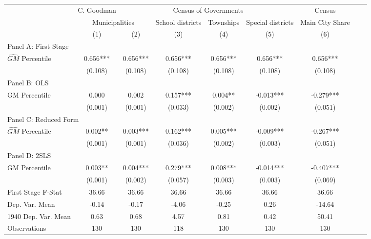  \begin{tabular}{l*{8}{c}} \toprule
&\multicolumn{1}{c}{C. Goodman}&\multicolumn{4}{c}{Census of Governments}&\multicolumn{1}{c}{Census}\\\cmidrule(lr){2-2}\cmidrule(lr){3-6}\cmidrule(lr){7-7}
&\multicolumn{2}{c}{Municipalities}&\multicolumn{1}{c}{School districts}&\multicolumn{1}{c}{Townships}&\multicolumn{1}{c}{Special districts}&\multicolumn{1}{c}{Main City Share}\\\cmidrule(lr){2-3}\cmidrule(lr){4-6}\cmidrule(lr){7-7}
&\multicolumn{1}{c}{(1)}&\multicolumn{1}{c}{(2)}&\multicolumn{1}{c}{(3)}&\multicolumn{1}{c}{(4)}&\multicolumn{1}{c}{(5)}&\multicolumn{1}{c}{(6)}\\
\cmidrule(lr){1-7}
\multicolumn{6}{l}{Panel A: First Stage}\\
\cmidrule(lr){1-7}
$\widehat{GM}$ Percentile&    0.656***&    0.656***&    0.656***&    0.656***&    0.656***&    0.656***\\
                &  (0.108)   &  (0.108)   &  (0.108)   &  (0.108)   &  (0.108)   &  (0.108)   \\
\cmidrule(lr){1-7}
\multicolumn{6}{l}{Panel B: OLS}\\
\cmidrule(lr){1-7}
GM Percentile   &    0.000   &    0.002   &    0.157***&    0.004** &   -0.013***&   -0.279***\\
                &  (0.001)   &  (0.001)   &  (0.033)   &  (0.002)   &  (0.002)   &  (0.051)   \\
\cmidrule(lr){1-7}
\multicolumn{6}{l}{Panel C: Reduced Form}\\
\cmidrule(lr){1-7}
$\widehat{GM}$ Percentile&    0.002** &    0.003***&    0.162***&    0.005***&   -0.009***&   -0.267***\\
                &  (0.001)   &  (0.001)   &  (0.036)   &  (0.002)   &  (0.003)   &  (0.051)   \\
\cmidrule(lr){1-7}
\multicolumn{6}{l}{Panel D: 2SLS}\\
\cmidrule(lr){1-7}
GM Percentile   &    0.003** &    0.004***&    0.279***&    0.008***&   -0.014***&   -0.407***\\
                &  (0.001)   &  (0.002)   &  (0.057)   &  (0.003)   &  (0.003)   &  (0.069)   \\
\midrule
First Stage F-Stat&    36.66   &    36.66   &    36.66   &    36.66   &    36.66   &    36.66   \\
Dep. Var. Mean  &    -0.14   &    -0.17   &    -4.06   &    -0.25   &     0.26   &   -14.64   \\
1940 Dep. Var. Mean&     0.63   &     0.68   &     4.57   &     0.81   &     0.42   &    50.41   \\
Observations    &      130   &      130   &      118   &      130   &      130   &      130   \\
       \bottomrule \end{tabular}
